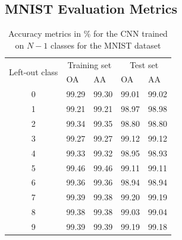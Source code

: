 \documentclass[10pt]{article}
\begin{document}
\subsection{MNIST Evaluation Metrics}
\label{subsec:app-eval-mnist}

\begin{table}[H]
\centering
    \begin{tabular}{cllll}
    \toprule
    \multirow{2}{*}{Left-out class} & \multicolumn{2}{c}{Training set} & \multicolumn{2}{c}{Test set} \\
                   & OA    & AA    & OA    & AA    \\\midrule
    0              & 99.29 & 99.30 & 99.01 & 99.02 \\
    1              & 99.21 & 99.21 & 98.97 & 98.98 \\
    2              & 99.34 & 99.35 & 98.80 & 98.80 \\
    3              & 99.27 & 99.27 & 99.12 & 99.12 \\
    4              & 99.33 & 99.32 & 98.95 & 98.93 \\
    5              & 99.46 & 99.46 & 99.11 & 99.11 \\
    6              & 99.36 & 99.36 & 98.94 & 98.94 \\
    7              & 99.39 & 99.38 & 99.20 & 99.19 \\
    8              & 99.38 & 99.38 & 99.03 & 99.04 \\
    9              & 99.39 &  99.39 &  99.19 &  99.18\\\bottomrule
    \end{tabular}
    \caption{Accuracy metrics in \% for the \gls{CNN} trained on $N-1$ classes for the \gls{MNIST} dataset}
    \label{table:mnist-nd-accuracy}
\end{table}
\end{document}

